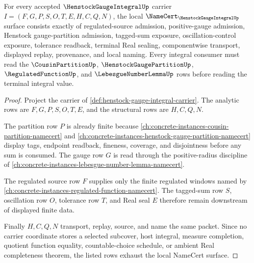 \begin{theorem}
\label{thm:henstock-gauge-integral-namecert-obligations}
For every accepted $\HenstockGaugeIntegralUp$ carrier $I=(F,G,P,S,O,T,E,H,C,Q,N)$, the local $\NameCert_{\HenstockGaugeIntegralUp}$ surface consists exactly of regulated-source admission, positive-gauge admission, Henstock gauge-partition admission, tagged-sum exposure, oscillation-control exposure, tolerance readback, terminal Real sealing, componentwise transport, displayed replay, provenance, and local naming. Every integral consumer must read the $\CousinPartitionUp$, $\HenstockGaugePartitionUp$, $\RegulatedFunctionUp$, and $\LebesgueNumberLemmaUp$ rows before reading the terminal integral value.
\end{theorem}
\begin{proof}
Project the carrier of \autoref{def:henstock-gauge-integral-carrier}. The analytic rows are $F,G,P,S,O,T,E$, and the structural rows are $H,C,Q,N$.

The partition row $P$ is already finite because \autoref{ch:concrete-instances-cousin-partition-namecert} and \autoref{ch:concrete-instances-henstock-gauge-partition-namecert} display tags, endpoint readback, fineness, coverage, and disjointness before any sum is consumed. The gauge row $G$ is read through the positive-radius discipline of \autoref{ch:concrete-instances-lebesgue-number-lemma-namecert}.

The regulated source row $F$ supplies only the finite regulated windows named by \autoref{ch:concrete-instances-regulated-function-namecert}. The tagged-sum row $S$, oscillation row $O$, tolerance row $T$, and Real seal $E$ therefore remain downstream of displayed finite data.

Finally $H,C,Q,N$ transport, replay, source, and name the same packet. Since no carrier coordinate stores a selected subcover, host integral, measure completion, quotient function equality, countable-choice schedule, or ambient Real completeness theorem, the listed rows exhaust the local NameCert surface.
\end{proof}

